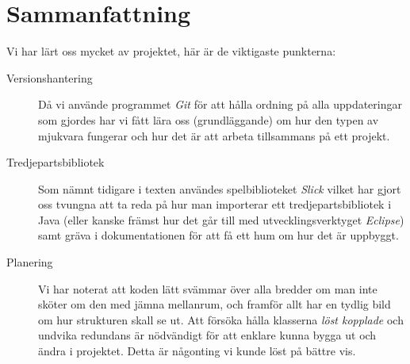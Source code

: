 \documentclass[11pt,a4paper]{article}
\begin{document}
\section{Sammanfattning}
Vi har lärt oss mycket av projektet, här är de viktigaste punkterna:

\begin{description}
	\item[Versionshantering] Då vi använde programmet \emph{Git} för att hålla ordning på alla uppdateringar som gjordes har vi fått lära oss (grundläggande) om hur den typen av mjukvara fungerar och hur det är att arbeta tillsammans på ett projekt.
	\item[Tredjepartsbibliotek] Som nämnt tidigare i texten användes spelbiblioteket \emph{Slick} vilket har gjort oss tvungna att ta reda på hur man importerar ett tredjepartsbibliotek i Java (eller kanske främst hur det går till med utvecklingsverktyget \emph{Eclipse}) samt gräva i dokumentationen för att få ett hum om hur det är uppbyggt.
	\item[Planering] Vi har noterat att koden lätt svämmar över alla bredder om man inte sköter om den med jämna mellanrum, och framför allt har en tydlig bild om hur strukturen skall se ut. Att försöka hålla klasserna \emph{löst kopplade} och undvika redundans är nödvändigt för att enklare kunna bygga ut och ändra i projektet. Detta är någonting vi kunde löst på bättre vis.
\end{description}
\end{document}
